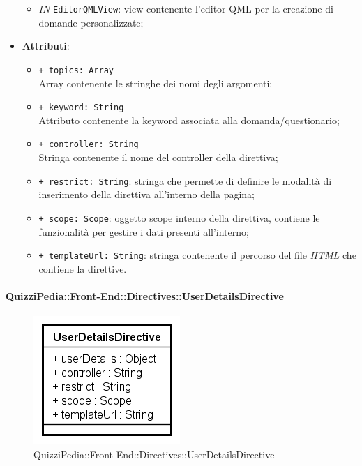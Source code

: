 \begin{itemize}
\begin{itemize}
		\item \textit{IN} \texttt{EditorQMLView}: view contenente l'editor QML per la creazione di domande personalizzate;
	\end{itemize}
	\item \textbf{Attributi}:
	\begin{itemize}
		\item \texttt{+ topics: Array} \\ Array contenente le stringhe dei nomi degli argomenti;
		\item \texttt{+ keyword: String} \\ Attributo contenente la keyword associata alla domanda/questionario;
		\item \texttt{+ controller: String} \\ Stringa contenente il nome del controller della direttiva;
		\item \texttt{+ restrict: String}: stringa che permette di definire le modalità di inserimento della direttiva all'interno della pagina;
		\item \texttt{+ scope: Scope}: oggetto scope interno della direttiva, contiene le funzionalità per gestire i dati presenti all'interno;
		\item \texttt{+ templateUrl: String}: stringa contenente il percorso del file \textit{HTML} che contiene la direttive.
	\end{itemize}
\end{itemize}

\paragraph{QuizziPedia::Front-End::Directives::UserDetailsDirective}

\label{QuizziPedia::Front-End::Directives::UserDetailsDirective}

\begin{figure}[h]
	\centering
	\includegraphics[scale=0.80,keepaspectratio]{UML/Classi/Front-End/QuizziPedia_Front-end_Directives_UserDetailsDirective.png}
	\caption{QuizziPedia::Front-End::Directives::UserDetailsDirective}
\end{figure}

